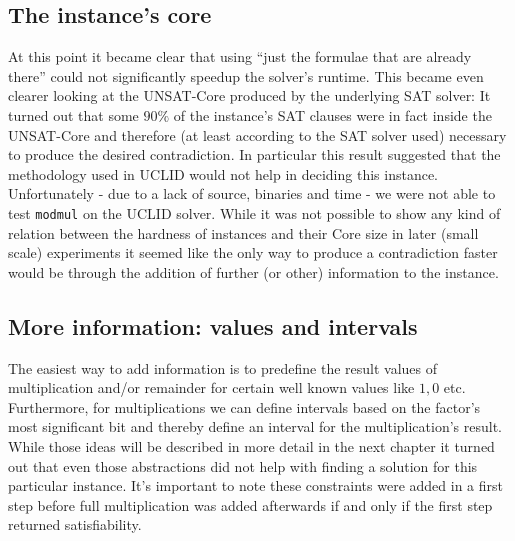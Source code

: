 \subsection{The instance's core}
At this point it became clear that using \enquote{just the formulae that are already there} could not significantly speedup the solver's runtime. This became even clearer looking at the UNSAT-Core produced by the underlying SAT solver: It turned out that some $90\%$ of the instance's SAT clauses were in fact inside the UNSAT-Core and therefore (at least according to the SAT solver used) necessary to produce the desired contradiction.
In particular this result suggested that the methodology used in UCLID \cite{Bryant2007_Chapter_DecidingBit-VectorArithmeticWi-UCLID} would not help in deciding this instance.
Unfortunately - due to a lack of source, binaries and time - we were not able to test \texttt{modmul} on the UCLID solver.
While it was not possible to show any kind of relation between the hardness of instances and their Core size in later (small scale) experiments it seemed like the only way to produce a contradiction faster would be through the addition of further (or other) information to the instance.

\subsection{More information: values and intervals}
The easiest way to add information is to predefine the result values of multiplication and/or remainder for certain well known values like $1,0$ etc. Furthermore, for multiplications we can define intervals based on the  factor's most significant bit and thereby define an interval for the multiplication's result. While those ideas will be described in more detail in the next chapter it turned out that even those abstractions did not help with finding a solution for this particular instance. It's important to note these constraints were added in a first step before full multiplication was added afterwards if and only if the first step returned satisfiability.


